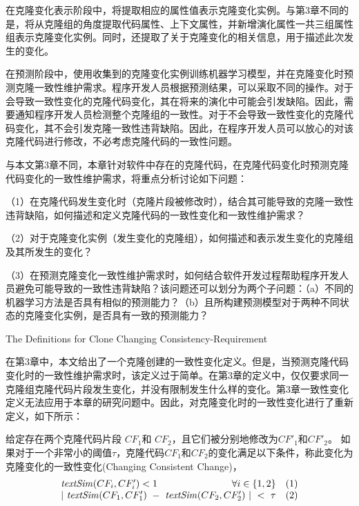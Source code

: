 在克隆变化表示阶段中，将提取相应的属性值表示克隆变化实例。与第3章不同的是，将从克隆组的角度提取代码属性、上下文属性，并新增演化属性一共三组属性组表示克隆变化实例。同时，还提取了关于克隆变化的相关信息，用于描述此次发生的变化。

在预测阶段中，使用收集到的克隆变化实例训练机器学习模型，并在克隆变化时预测克隆一致性维护需求。程序开发人员根据预测结果，可以采取不同的操作。对于会导致一致性变化的克隆代码变化，其在将来的演化中可能会引发缺陷。因此，需要通知程序开发人员检测整个克隆组的一致性。对于不会导致一致性变化的克隆代码变化，其不会引发克隆一致性违背缺陷。因此，在程序开发人员可以放心的对该克隆代码进行修改，不必考虑克隆代码的一致性问题。

与本文第3章不同，本章针对软件中存在的克隆代码，在克隆代码变化时预测克隆代码变化的一致性维护需求，将重点分析讨论如下问题：

（1）在克隆代码发生变化时（克隆片段被修改时），结合其可能导致的克隆一致性违背缺陷，如何描述和定义克隆代码的一致性变化和一致性维护需求？

（2）对于克隆变化实例（发生变化的克隆组），如何描述和表示发生变化的克隆组及其所发生的变化？

（3）在预测克隆变化一致性维护需求时，如何结合软件开发过程帮助程序开发人员避免可能导致的一致性违背缺陷？该问题还可以划分为两个子问题：（a）不同的机器学习方法是否具有相似的预测能力？（b）且所构建预测模型对于两种不同状态的克隆变化实例，是否具有一致的预测能力？


{The Definitions for Clone Changing Consistency-Requirement}

在第3章中，本文给出了一个克隆创建的一致性变化定义。但是，当预测克隆代码变化时的一致性维护需求时，该定义过于简单。在第3章的定义中，仅仅要求同一克隆组克隆代码片段发生变化，并没有限制发生什么样的变化。第3章一致性变化定义无法应用于本章的研究问题中。因此，对克隆变化时的一致性变化进行了重新定义，如下所示：

\begin{definition}[克隆变化一致性变化]  
\label{def-changingchange}
给定存在两个克隆代码片段 $CF_1$和 $CF_2$，且它们被分别地修改为$CF'_1$和$CF'_2$。  如果对于一个非常小的阈值$\tau$，克隆代码$CF_1$和$CF_2$的变化满足以下条件，称此变化为克隆变化的一致性变化(Changing Consistent Change)， 
  \[
  \begin{array}[t]{crl}
    \mathit{textSim}(CF_i, CF'_i) < 1 & \forall i \in \{1,2\} &(1) \\
    \multicolumn{2}{c}{| ~\mathit{textSim}(CF_1,CF'_1)  ~-~ \mathit{textSim}(CF_2,CF'_2) ~| ~< ~ \tau}  & (2)
  \end{array}
  \]
\end{definition}


